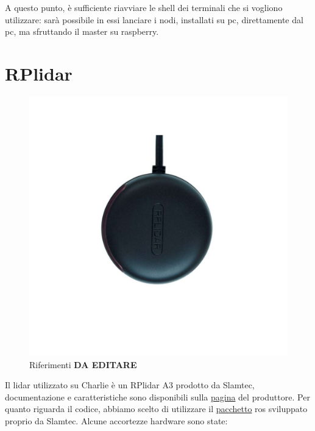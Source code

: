 A questo punto, è sufficiente riavviare le shell dei terminali che si vogliono utilizzare: sarà possibile in essi lanciare i nodi, installati su pc, direttamente dal pc, ma sfruttando il master su raspberry.

\section{RPlidar}
\begin{figure}[] 
	\centering    
	\includegraphics[height=.2\textheight]{rplidar_axis.pdf}
	\caption{Riferimenti  \textbf{DA EDITARE}}
	\label{fig: rplidar axis}
\end{figure}

Il lidar utilizzato su Charlie \`e un RPlidar A3 prodotto da Slamtec, documentazione e caratteristiche sono disponibili sulla \href{https://www.slamtec.com/en/Lidar/A3}{pagina} del produttore.
Per quanto riguarda il codice, abbiamo scelto di utilizzare il \href{https://wiki.ros.org/rplidar}{pacchetto} ros sviluppato proprio da Slamtec. 
Alcune accortezze hardware sono state:

